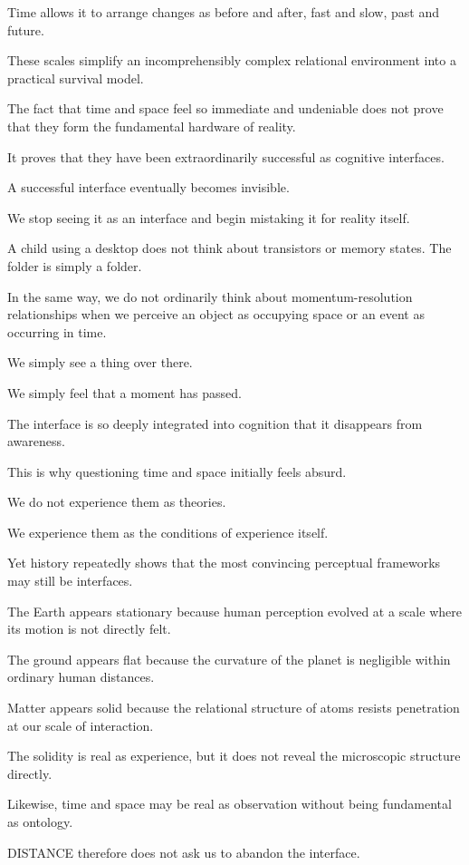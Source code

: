 Time allows it to arrange changes as before and after, fast and slow, past and future.

These scales simplify an incomprehensibly complex relational environment into a practical survival model.

The fact that time and space feel so immediate and undeniable does not prove that they form the fundamental hardware of reality.

It proves that they have been extraordinarily successful as cognitive interfaces.

A successful interface eventually becomes invisible.

We stop seeing it as an interface and begin mistaking it for reality itself.

A child using a desktop does not think about transistors or memory states. The folder is simply a folder.

In the same way, we do not ordinarily think about momentum-resolution relationships when we perceive an object as occupying space or an event as occurring in time.

We simply see a thing over there.

We simply feel that a moment has passed.

The interface is so deeply integrated into cognition that it disappears from awareness.

This is why questioning time and space initially feels absurd.

We do not experience them as theories.

We experience them as the conditions of experience itself.

Yet history repeatedly shows that the most convincing perceptual frameworks may still be interfaces.

The Earth appears stationary because human perception evolved at a scale where its motion is not directly felt.

The ground appears flat because the curvature of the planet is negligible within ordinary human distances.

Matter appears solid because the relational structure of atoms resists penetration at our scale of interaction.

The solidity is real as experience, but it does not reveal the microscopic structure directly.

Likewise, time and space may be real as observation without being fundamental as ontology.

DISTANCE therefore does not ask us to abandon the interface.

